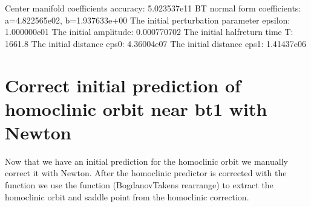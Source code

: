 \documentclass[letterpaper,10pt,english]{jupyterBook}
\begin{document}
\begin{sphinxVerbatim}[commandchars=\\\{\}]
\PYG{p}{[}\PYG{p}{]}
\end{sphinxVerbatim}

\begin{sphinxVerbatim}[commandchars=\\\{\}]
Center manifold coefficients\PYGZsq{} accuracy: 5.023537e\PYGZhy{}11
BT normal form coefficients:
a=\PYGZhy{}4.822565e\PYGZhy{}02,	 b=\PYGZhy{}1.937633e+00
The initial perturbation parameter epsilon:  1.000000e\PYGZhy{}01
The initial amplitude: 0.000770702
The initial half\PYGZhy{}return time T: 1661.8
The initial distance eps0: 4.36004e\PYGZhy{}07
The initial distance eps1: 1.41437e\PYGZhy{}06
\end{sphinxVerbatim}


\section{Correct initial prediction of homoclinic orbit near bt1 with Newton}
\label{\detokenize{CO-oxidation:correct-initial-prediction-of-homoclinic-orbit-near-bt1-with-newton}}
\sphinxAtStartPar
Now that we have an initial prediction for the homoclinic orbit we
manually correct it with Newton. After the homoclinic predictor is corrected
with the  function  we use the function 
(Bogdanov\sphinxhyphen{}Takens rearrange) to extract the homoclinic orbit and saddle
point from the homoclinic correction.
\end{document}
